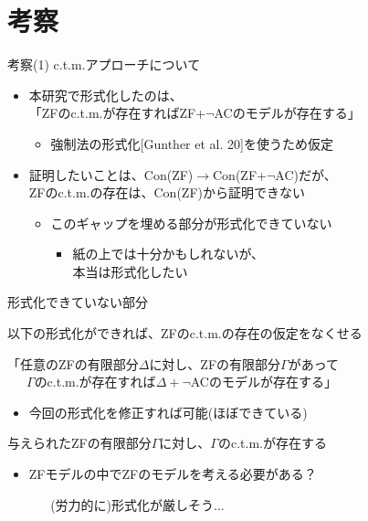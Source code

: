 \documentclass[17pt,aspectratio=169]{beamer}
\begin{document}
\section {考察}

\begin{frame}{考察(1) {\normalsize c.t.m.アプローチについて}}
    \vspace{-30pt}
    \,{\small 
    \begin{itemize}
        \item 本研究で形式化したのは、\\
              「ZFのc.t.m.が存在すればZF+$\neg$ACのモデルが存在する」
              \begin{itemize}
                \item 強制法の形式化[Gunther et al. 20]を使うため仮定
              \end{itemize}
        \item 証明したいことは、Con(ZF)$\rightarrow$Con(ZF+$\neg$AC)だが、\\
              ZFのc.t.m.の存在は、Con(ZF)から証明できない
              \begin{itemize} 
                \item このギャップを埋める部分が形式化できていない
                \begin{itemize}
                    \item 紙の上では十分かもしれないが、\\
                          本当は形式化したい
                \end{itemize}
              \end{itemize}
    \end{itemize}
    }
\end{frame}

\begin{frame}{形式化できていない部分}
    \,
    {\small 
        以下の形式化ができれば、ZFのc.t.m.の存在の仮定をなくせる

        \textbullet「任意のZFの有限部分$\Delta$に対し、ZFの有限部分$\Gamma$があって\\
                  \,\,\,\,\,\,\,\,\,$\Gamma$のc.t.m.が存在すれば$\Delta + \neg$ACのモデルが存在する」
                  \vspace{-5pt}
                  \begin{itemize}[left=1.5cm]
                    \item [\textasteriskcentered] 今回の形式化を修正すれば可能(ほぼできている)
                  \end{itemize}
        \textbullet 与えられたZFの有限部分$\Gamma$に対し、$\Gamma$のc.t.m.が存在する
                  \vspace{-5pt}
                  \begin{itemize}[itemsep=5pt,left=1.5cm]
                    \item [\textasteriskcentered] ZFモデルの中でZFのモデルを考える必要がある？
                    
                    \,\,\,\,\,\,\,\,\textendash \,\,(労力的に)形式化が厳しそう...
                  \end{itemize}
    }
\end{frame}
\end{document}
